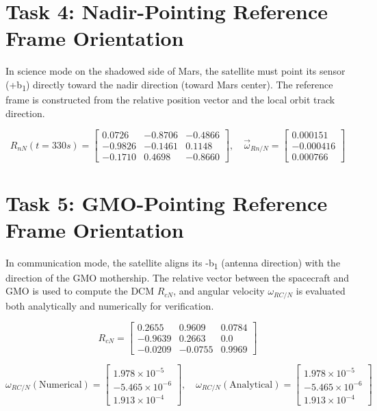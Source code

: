 \documentclass[conf]{new-aiaa}
\begin{document}
\section{Task 4: Nadir-Pointing Reference Frame Orientation}
In science mode on the shadowed side of Mars, the satellite must point its sensor (+b\textsubscript{1}) directly toward the nadir direction (toward Mars center). The reference frame is constructed from the relative position vector and the local orbit track direction.

\[
R_{nN}(t = 330s) = 
\begin{bmatrix}
0.0726 & -0.8706 & -0.4866 \\
-0.9826 & -0.1461 & 0.1148 \\
-0.1710 & 0.4698 & -0.8660
\end{bmatrix}, \quad
\vec{\omega}_{Rn/N} = 
\begin{bmatrix}
0.000151 \\ -0.000416 \\ 0.000766
\end{bmatrix}
\]

\section{Task 5: GMO-Pointing Reference Frame Orientation}
In communication mode, the satellite aligns its -b\textsubscript{1} (antenna direction) with the direction of the GMO mothership. The relative vector between the spacecraft and GMO is used to compute the DCM $R_{cN}$, and angular velocity $\omega_{RC/N}$ is evaluated both analytically and numerically for verification.

\[
R_{cN} =
\begin{bmatrix}
0.2655 & 0.9609 & 0.0784 \\
-0.9639 & 0.2663 & 0.0 \\
-0.0209 & -0.0755 & 0.9969
\end{bmatrix}
\]

\[
\omega_{RC/N} (\text{Numerical}) =
\begin{bmatrix}
1.978 \times 10^{-5} \\
-5.465 \times 10^{-6} \\
1.913 \times 10^{-4}
\end{bmatrix}, \quad
\omega_{RC/N} (\text{Analytical}) =
\begin{bmatrix}
1.978 \times 10^{-5} \\
-5.465 \times 10^{-6} \\
1.913 \times 10^{-4}
\end{bmatrix}
\]
\end{document}
